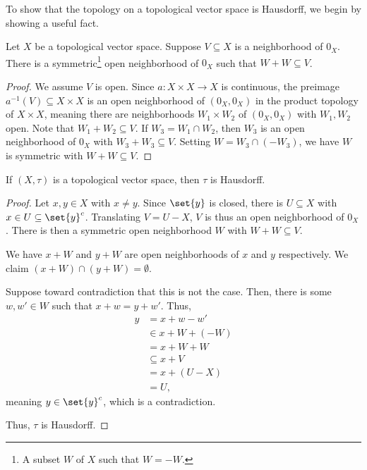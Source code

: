 \documentclass[10pt]{mypackage}
\begin{document}
To show that the topology on a topological vector space is Hausdorff, we begin by showing a useful fact. 
\begin{lemma}
  Let $X$ be a topological vector space. Suppose $V\subseteq X$ is a neighborhood of $0_{X}$. There is a symmetric\footnote{A subset $W$ of $X$ such that $W = -W$.} open neighborhood of $0_{X}$ such that $W + W \subseteq V$.
\end{lemma}
\begin{proof}
  We assume $V$ is open. Since $a: X\times X \rightarrow X$ is continuous, the preimage $a^{-1}\left(V\right)\subseteq X\times X$ is an open neighborhood of $\left(0_X,0_X\right)$ in the product topology of $X\times X$, meaning there are neighborhoods $W_1\times W_2$ of $\left(0_X,0_X\right)$ with $W_1,W_2$ open. Note that $W_1 + W_2\subseteq V$. If $W_3 = W_1\cap W_2$, then $W_3$ is an open neighborhood of $0_X$ with $W_3 + W_3\subseteq V$. Setting $W = W_3\cap \left(-W_3\right)$, we have $W$ is symmetric with $W + W \subseteq V$.
\end{proof}
\begin{proposition}
  If $\left(X,\tau\right)$ is a topological vector space, then $\tau$ is Hausdorff.
\end{proposition}
\begin{proof}
  Let $x,y\in X$ with $x\neq y$. Since $\set{y}$ is closed, there is $U\subseteq X$ with $x\in U\subseteq \set{y}^{c}$. Translating $V = U-X$, $V$ is thus an open neighborhood of $0_X$. There is then a symmetric open neighborhood $W$ with $W+W\subseteq V$.\newline

  We have $x + W$ and $y+W$ are open neighborhoods of $x$ and $y$ respectively. We claim $\left(x+W\right)\cap \left(y+W\right) = \emptyset$.\newline

  Suppose toward contradiction that this is not the case. Then, there is some $w,w'\in W$ such that $x+w = y + w'$. Thus,
  \begin{align*}
    y &= x+w-w'\\
      &\in x + W + \left(-W\right)\\
      &= x + W + W\\
      &\subseteq x + V\\
      &= x + \left(U-X\right)\\
      &= U,
  \end{align*}
  meaning $y\in \set{y}^{c}$, which is a contradiction.\newline

  Thus, $\tau$ is Hausdorff.
\end{proof}
\end{document}
